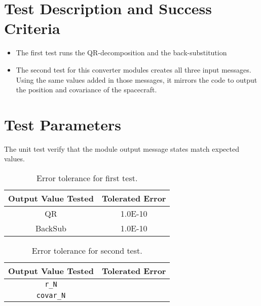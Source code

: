 
\section{Test Description and Success Criteria}
\begin{itemize}
\item The first test runs the QR-decomposition and the back-substitution
\item The second test for this converter modules creates all three input messages. Using the same values added in those messages, it mirrors the code to output the position and covariance of the spacecraft.
\end{itemize}
\section{Test Parameters}

The unit test verify that the module output message states match expected values.
\begin{table}[htbp]
	\caption{Error tolerance for first test.}
	\label{tab:errortol}
	\centering \fontsize{10}{10}\selectfont
	\begin{tabular}{ c | c } %
		\hline\hline
		\textbf{Output Value Tested}  & \textbf{Tolerated Error}  \\ 
		\hline
		QR             &  1.0E-10	   \\ 
		BackSub        & 1.0E-10   \\ 
		\hline\hline
	\end{tabular}
\end{table}

\begin{table}[htbp]
	\caption{Error tolerance for second test.}
	\label{tab:errortol}
	\centering \fontsize{10}{10}\selectfont
	\begin{tabular}{ c | c } %
		\hline\hline
		\textbf{Output Value Tested}  & \textbf{Tolerated Error}  \\ 
		\hline
		{\tt r\_N}        & 	   \\ 
		{\tt covar\_N}        & 	   \\ 
		\hline\hline
	\end{tabular}
\end{table}

